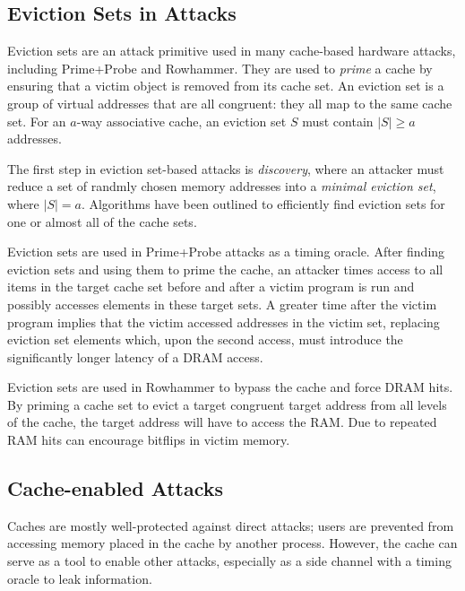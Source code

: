 \documentclass[letterpaper]{article}
\begin{document}
\subsection{Eviction Sets in Attacks}

Eviction sets are an attack primitive used in many cache-based hardware attacks,
including Prime+Probe and Rowhammer.
They are used to \textit{prime} a cache by ensuring that a victim object is removed from its cache set.
An eviction set is a group of virtual addresses that are all congruent: they all map to the same cache set.
For an $a$-way associative cache, an eviction set $S$ must contain $|S| \geq a$ addresses.

The first step in eviction set-based attacks is \textit{discovery},
where an attacker must reduce a set of randmly chosen memory addresses
into a \textit{minimal eviction set}, where $|S| = a$.
Algorithms have been outlined to efficiently find eviction sets for one or almost all
of the cache sets.

Eviction sets are used in Prime+Probe attacks as a timing oracle.
After finding eviction sets and using them to prime the cache,
an attacker times access to all items in the target cache set
before and after a victim program is run and possibly accesses elements in these target sets.
A greater time after the victim program implies that the victim accessed addresses in the victim set,
replacing eviction set elements which, upon the second access,
must introduce the significantly longer latency of a DRAM access.

Eviction sets are used in Rowhammer to bypass the cache and force DRAM hits.
By priming a cache set to evict a target congruent target address from all levels of the cache,
the target address will have to access the RAM.
Due to %
repeated RAM hits can encourage bitflips in victim memory.

\subsection{Cache-enabled Attacks}
Caches are mostly well-protected against direct attacks;
users are prevented from accessing memory placed in the cache by another process.
However, the cache can serve as a tool to enable other attacks,
especially as a side channel with a timing oracle to leak information.
\end{document}
